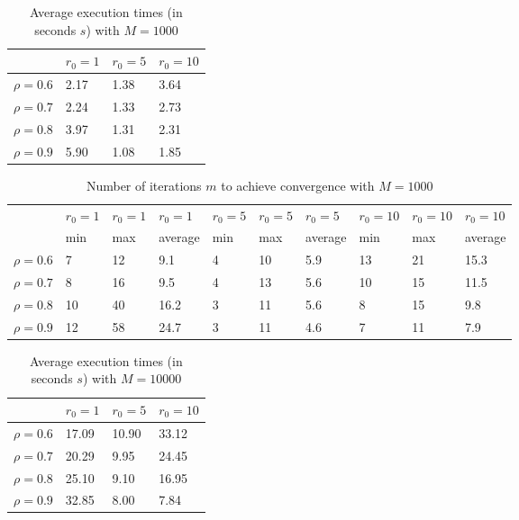 \documentclass[a4paper,11pt,openright]{report}
\begin{document}
\begin{table}[H]
\centering
\addtolength{\leftskip}{-1.5cm}
\addtolength{\rightskip}{-1.5cm}
\begin{tabular}{|c|lll|}
\hline
$ $ & $r_0 = 1$ & $r_0 = 5$ & $r_0 = 10$ \\
\hline
$\rho = 0.6$ & 2.17 & 1.38 & 3.64 \\

$\rho = 0.7$ & 2.24 & 1.33 & 2.73 \\

$\rho = 0.8$ & 3.97 & 1.31 & 2.31 \\

$\rho = 0.9$ & 5.90 & 1.08 & 1.85 \\
\hline
\end{tabular}
\caption{Average execution
 times (in seconds $s$) with $M = 1000$}
\end{table}
\begin{table}[H]
\centering
\addtolength{\leftskip}{-1.5cm}
\addtolength{\rightskip}{-1.5cm}
\begin{tabular}{|c|lllllllll|}
\hline
$ $ & $r_0 = 1$ & $r_0 = 1$ & $r_0 = 1$ & $r_0 = 5$ & $r_0 = 5$ & $r_0 = 5$ & $r_0 = 10$ & $r_0 = 10$ & $r_0 = 10$  \\
$ $ & min & max & average & min & max & average & min & max & average \\ 
\hline
$\rho = 0.6$ & 7 & 12 & 9.1 & 4 & 10 & 5.9 & 13 & 21 & 15.3 \\

$\rho = 0.7$ & 8 & 16 & 9.5 & 4 & 13 & 5.6 & 10 & 15 & 11.5 \\

$\rho = 0.8$ & 10 & 40 & 16.2 & 3 & 11 & 5.6 & 8 & 15 & 9.8 \\

$\rho = 0.9$ & 12 & 58 & 24.7 & 3 & 11 & 4.6 & 7 & 11 & 7.9\\
\hline
\end{tabular}
\caption{Number of iterations $m$ to achieve convergence with $M = 1000$}
\end{table}
\begin{table}[H]
\centering
\addtolength{\leftskip}{-1.5cm}
\addtolength{\rightskip}{-1.5cm}
\begin{tabular}{|c|lll|}
\hline
$ $ & $r_0 = 1$ & $r_0 = 5$ & $r_0 = 10$ \\
\hline
$\rho = 0.6$ & 17.09 & 10.90 & 33.12 \\

$\rho = 0.7$ & 20.29 & 9.95 & 24.45 \\

$\rho = 0.8$ & 25.10 & 9.10 & 16.95 \\

$\rho = 0.9$ & 32.85 & 8.00 & 7.84 \\
\hline
\end{tabular}
\caption{Average execution
 times (in seconds $s$) with $M = 10000$}
\end{table}
\end{document}
